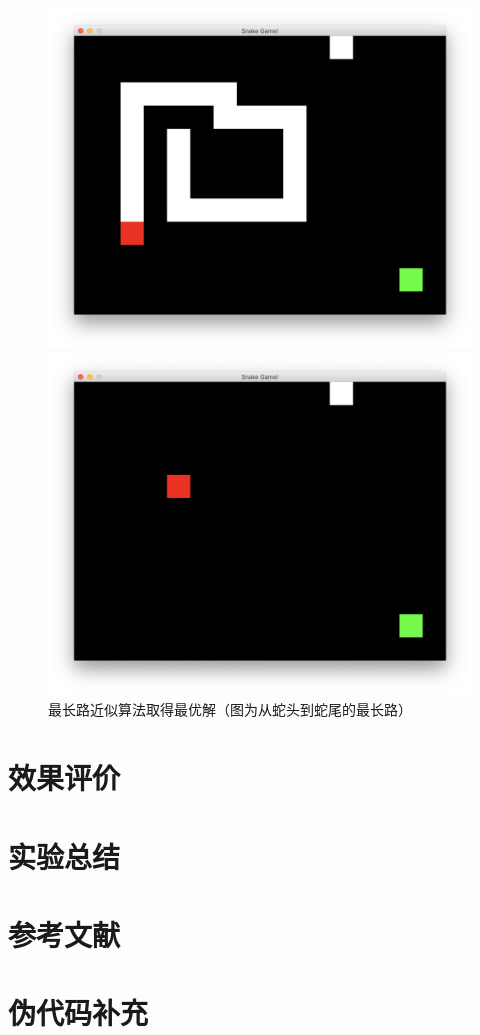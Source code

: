 \documentclass[a4paper]{article}
\begin{document}
\begin{figure}[!hbt]
\begin{minipage}{0.16\textwidth}
    \includegraphics[width=\linewidth]{assets/lp5.png}
\end{minipage}
\begin{minipage}{0.16\textwidth}
    \centering
    \includegraphics[width=\linewidth]{assets/lp6.png}
\end{minipage}
    \caption{最长路近似算法取得最优解（图为从蛇头到蛇尾的最长路）} \label{fig:lp}
\end{figure}




\section{效果评价}\label{sec:eval}
\section{实验总结}
\begin{appendices}
\section{参考文献} \label{sec:reference}
\section{伪代码补充} \label{sec:file}

\end{appendices}
\end{document}
